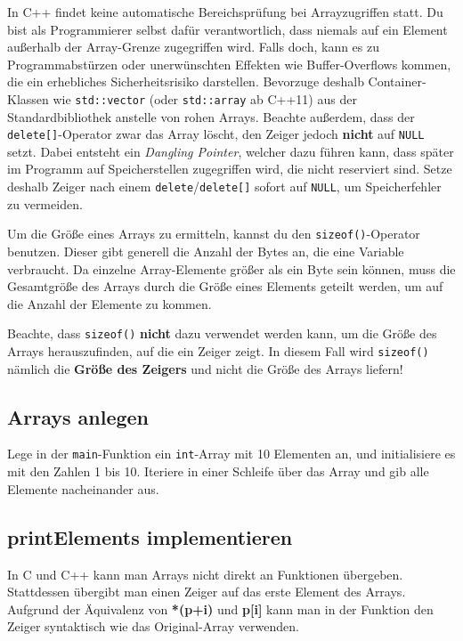In C++ findet keine automatische Bereichsprüfung bei Arrayzugriffen statt.
Du bist als Programmierer selbst dafür verantwortlich, dass niemals auf ein Element außerhalb der Array-Grenze zugegriffen wird.
Falls doch, kann es zu Programmabstürzen oder unerwünschten Effekten wie Buffer-Overflows kommen, die ein erhebliches Sicherheitsrisiko darstellen.
Bevorzuge deshalb Container-Klassen wie \lstinline{std::vector} (oder \lstinline{std::array} ab C++11) aus der Standardbibliothek anstelle von \glqq rohen\grqq{} Arrays.
Beachte außerdem, dass der \lstinline{delete[]}-Operator zwar das Array löscht, den Zeiger jedoch \textbf{nicht} auf \lstinline{NULL} setzt.
Dabei entsteht ein \emph{Dangling Pointer}, welcher dazu führen kann, dass später im Programm auf Speicherstellen zugegriffen wird, die nicht reserviert sind.
Setze deshalb Zeiger nach einem \lstinline{delete}/\lstinline{delete[]} sofort auf \lstinline{NULL}, um Speicherfehler zu vermeiden.

Um die Größe eines Arrays zu ermitteln, kannst du den \lstinline{sizeof()}-Operator benutzen.
Dieser gibt generell die Anzahl der Bytes an, die eine Variable verbraucht.
Da einzelne Array-Elemente größer als ein Byte sein können, muss die Gesamtgröße des Arrays durch die Größe eines Elements geteilt werden, um auf die Anzahl der Elemente zu kommen.


Beachte, dass \lstinline{sizeof()} \textbf{nicht} dazu verwendet werden kann, um die Größe des Arrays herauszufinden, auf die ein Zeiger zeigt.
In diesem Fall wird \lstinline{sizeof()} nämlich die \textbf{Größe des Zeigers} und nicht die Größe des Arrays liefern!


\subsection{Arrays anlegen}
Lege in der \lstinline{main}-Funktion ein \lstinline{int}-Array mit 10 Elementen an, und initialisiere es mit den Zahlen 1 bis 10.
Iteriere in einer Schleife über das Array und gib alle Elemente nacheinander aus.

\subsection{printElements implementieren}
In C und C++ kann man Arrays nicht direkt an Funktionen übergeben.
Stattdessen übergibt man einen Zeiger auf das erste Element des Arrays. Aufgrund der Äquivalenz von \textbf{*(p+i) } und \textbf{p[i]} kann man in der Funktion den Zeiger syntaktisch wie das Original-Array verwenden.

